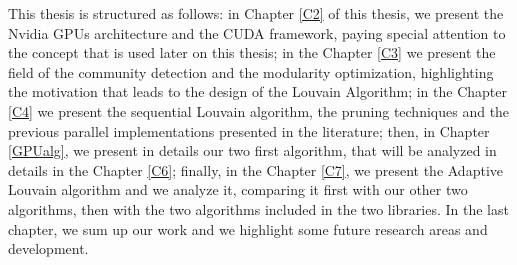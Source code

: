 This thesis is structured as follows:
in Chapter \ref{C2} of this thesis, we present the Nvidia GPUs architecture and the CUDA framework, paying special attention to the concept that is used later on this thesis; in the Chapter \ref{C3} we present the field of the community detection and the modularity optimization, highlighting the motivation that leads to the design of the Louvain Algorithm; in the Chapter \ref{C4} we present the sequential Louvain algorithm, the pruning techniques and the previous parallel implementations presented in the literature;
then, in Chapter \ref{GPUalg}, we present in details our two first algorithm, that will be analyzed in details in the Chapter \ref{C6}; finally, in the Chapter \ref{C7}, we present the Adaptive Louvain algorithm and we analyze it, comparing it first with our other two algorithms, then with the two algorithms included in the two libraries. In the last chapter, we sum up our work and we highlight some future research areas and development.